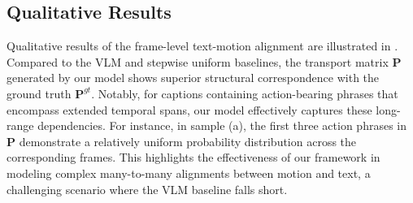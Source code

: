 \subsection{Qualitative Results}
Qualitative results of the frame-level text-motion alignment are illustrated in . Compared to the VLM and stepwise uniform baselines, the transport matrix $\mathbf{P}$ generated by our model shows superior structural correspondence with the ground truth $\mathbf{P}^{gt}$. Notably, for captions containing action-bearing phrases that encompass extended temporal spans, our model effectively captures these long-range dependencies. For instance, in sample (a), the first three action phrases in $\mathbf{P}$ demonstrate a relatively uniform probability distribution across the corresponding frames. This highlights the effectiveness of our framework in modeling complex many-to-many alignments between motion and text, a challenging scenario where the VLM baseline falls short.